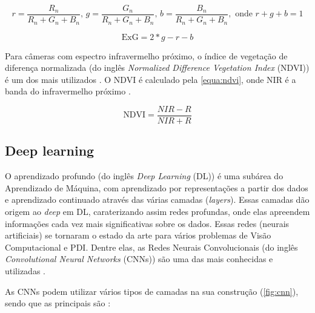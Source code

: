 \documentclass[12pt, a4paper, english, brazil]{article}
\begin{document}
\begin{equation}
    r = \frac{R_n}{R_n + G_n + B_n} \text{, } g = \frac{G_n}{R_n + G_n + B_n} \text{, } b = \frac{B_n}{R_n + G_n + B_n}, \text{ onde } r + g + b = 1
    \label{equa:chromatic}
\end{equation}

\begin{equation}
    \text{ExG} = 2 * g - r - b
    \label{equa:exg}
\end{equation}

Para câmeras com espectro infravermelho próximo, o 
índice de vegetação de diferença normalizada (do inglês \textit{Normalized Difference Vegetation Index} (NDVI)) é um dos mais utilizados \cite{Pereira_Junior_2020}. O NDVI é calculado pela \autoref{equa:ndvi}, onde NIR é a banda do infravermelho próximo \cite{Candiago_2015}.

\begin{equation}
    \text{NDVI} = \frac{NIR - R}{NIR + R}
    \label{equa:ndvi}
\end{equation}

\subsection{Deep learning} \label{sec:dl}

O aprendizado profundo (do inglês \textit{Deep Learning} (DL)) é uma subárea do Aprendizado de Máquina, com aprendizado por representações a partir dos dados e aprendizado continuado através das várias camadas (\textit{layers}). Essas camadas dão origem ao \textit{deep} em DL, caraterizando assim redes profundas, onde elas apreendem informações cada vez mais significativas sobre os dados. Essas redes (neurais artificiais) se tornaram o estado da arte para vários problemas de Visão Computacional e PDI. Dentre elas, as Redes Neurais Convolucionais (do inglês \textit{Convolutional Neural Networks} (CNNs)) são uma das mais conhecidas e utilizadas \cite{Ponti_2017}.

As CNNs podem utilizar vários tipos de camadas na sua construção (\autoref{fig:cnn}), sendo que as principais são \cite{Rawat_Wang_2017}:
\end{document}
